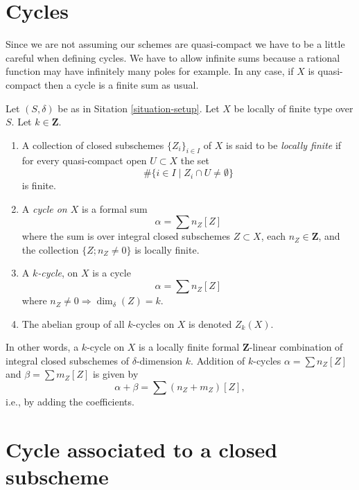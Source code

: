 \section{Cycles}
\label{section-cycles}

\noindent
Since we are not assuming our schemes are quasi-compact we have
to be a little careful when defining cycles. We have to allow
infinite sums because a rational function may have infinitely many
poles for example. In any case, if $X$ is quasi-compact then a
cycle is a finite sum as usual.

\begin{definition}
\label{definition-cycles}
Let $(S, \delta)$ be as in Sitation \ref{situation-setup}.
Let $X$ be locally of finite type over $S$.
Let $k \in \mathbf{Z}$.
\begin{enumerate}
\item A collection of closed subschemes $\{Z_i\}_{i \in I}$ of $X$
is said to be {\it locally finite} if for every quasi-compact open
$U \subset X$ the set
$$
\# \{i\in I \mid Z_i \cap U \not = \emptyset\}
$$
is finite.
\item A {\it cycle on $X$} is a formal sum
$$
\alpha = \sum n_Z [Z]
$$
where the sum is over integral closed subschemes $Z \subset X$,
each $n_Z \in \mathbf{Z}$, and the collection
$\{Z; n_Z \not = 0\}$ is locally finite.
\item A {\it $k$-cycle}, on $X$ is
a cycle
$$
\alpha = \sum n_Z [Z]
$$
where $n_Z \not = 0 \Rightarrow \dim_\delta(Z) = k$.
\item The abelian group of all $k$-cycles on $X$ is denoted $Z_k(X)$.
\end{enumerate}
\end{definition}

\noindent
In other words, a $k$-cycle on $X$
is a locally finite formal $\mathbf{Z}$-linear
combination of integral closed subschemes of $\delta$-dimension $k$.
Addition of $k$-cycles $\alpha = \sum n_Z[Z]$ and 
$\beta = \sum m_Z[Z]$ is given by
$$
\alpha + \beta = \sum (n_Z + m_Z)[Z],
$$
i.e., by adding the coefficients.




\section{Cycle associated to a closed subscheme}
\label{section-cycle-of-closed-subscheme}

